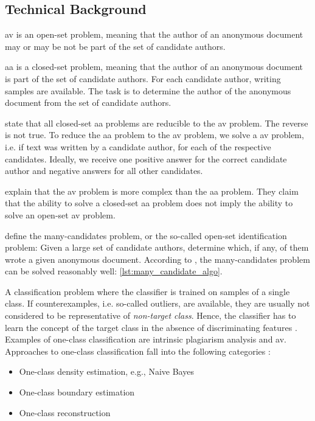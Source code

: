 \subsection{Technical Background}



\ac{av} is an open-set problem, meaning that the author of an anonymous document 
may or may be not be part of the set of candidate authors.

\ac{aa} is a closed-set problem, meaning that the author of an anonymous document
is part of the set of candidate authors.
For each candidate author, writing samples are available.
The task is to determine the author of the anonymous document from the set of candidate authors.

\citet{koppel_determining_2014} state that all closed-set \ac{aa} problems are reducible to the \ac{av} problem.
The reverse is not true.
To reduce the \ac{aa} problem to the \ac{av} problem, we solve a \ac{av} problem, i.e. if text was written by a candidate author, 
for each of the respective candidates.
Ideally, we receive one positive answer for the correct candidate author and negative answers for all other candidates.

\citet{koppel_determining_2014} explain that the \ac{av} problem is more complex than the \ac{aa} problem.
They claim that the ability to solve a closed-set \ac{aa} problem does not imply the ability to solve an open-set \ac{av} problem.

\citet{koppel_determining_2014} define the many-candidates problem, or the so-called open-set identification problem:
Given a large set of candidate authors, determine which, if any, of them wrote a given anonymous document.
According to \citet{koppel_determining_2014}, the many-candidates problem can be solved reasonably well: \autoref{lst:many_candidate_algo}.


\begin{definition}
    A classification problem where the classifier is trained on samples of a single class.
    If counterexamples, i.e. so-called outliers, are available, they are usually not considered to be representative of \textit{non-target class}.
    Hence, the classifier has to learn the concept of the target class in the absence of discriminating features 
    \citep{stein_intrinsic_2011,koppel_authorship_2004}.
    Examples of one-class classification are intrinsic plagiarism analysis and \ac{av}.
    Approaches to one-class classification fall into the following categories \citep{stein_intrinsic_2011}:
    \begin{itemize}
        \item One-class density estimation, e.g., Naive Bayes
        \item One-class boundary estimation
        \item One-class reconstruction
    \end{itemize}
\end{definition}

